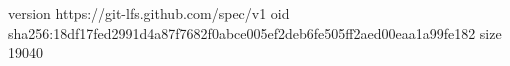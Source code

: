 version https://git-lfs.github.com/spec/v1
oid sha256:18df17fed2991d4a87f7682f0abce005ef2deb6fe505ff2aed00eaa1a99fe182
size 19040

